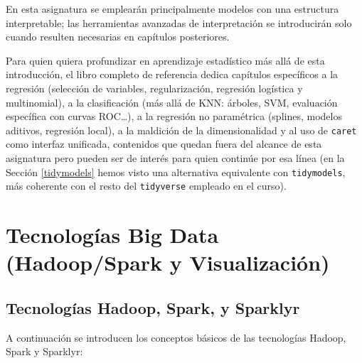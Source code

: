 \documentclass[
]{book}
\theoremstyle{break}
\theoremstyle{nonumberplain}
\begin{document}
En esta asignatura se emplearán principalmente modelos con una estructura interpretable; las herramientas avanzadas de interpretación se introducirán solo cuando resulten necesarias en capítulos posteriores.

Para quien quiera profundizar en aprendizaje estadístico más allá de esta introducción, el libro completo de referencia dedica capítulos específicos a la regresión (selección de variables, regularización, regresión logística y multinomial), a la clasificación (más allá de KNN: árboles, SVM, evaluación específica con curvas ROC\ldots), a la regresión no paramétrica (splines, modelos aditivos, regresión local), a la maldición de la dimensionalidad y al uso de \texttt{caret} como interfaz unificada, contenidos que quedan fuera del alcance de esta asignatura pero pueden ser de interés para quien continúe por esa línea (en la Sección \ref{tidymodels} hemos visto una alternativa equivalente con \texttt{tidymodels}, más coherente con el resto del \texttt{tidyverse} empleado en el curso).

\section{Tecnologías Big Data (Hadoop/Spark y Visualización)}\label{tecnologuxedas-big-data-hadoopspark-y-visualizaciuxf3n}

\subsection{Tecnologías Hadoop, Spark, y Sparklyr}\label{tecnologuxedas-hadoop-spark-y-sparklyr}

A continuación se introducen los conceptos básicos de las tecnologías Hadoop, Spark y Sparklyr:
\end{document}
